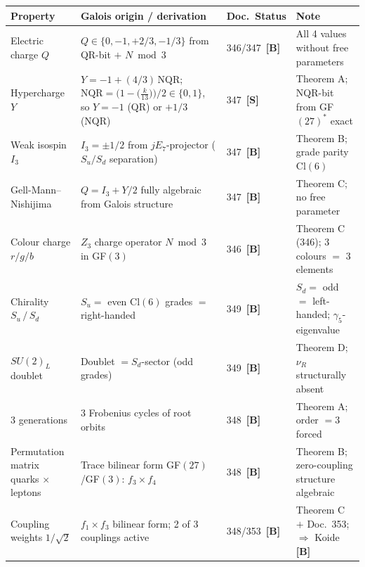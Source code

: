 \documentclass[10pt,a4paper,landscape]{article}
\begin{document}
\noindent
\begin{tabular}{|p{50mm}|p{68mm}|p{20mm}|p{125mm}|}
\hline
\rowcolor{hellgrau}
\textbf{Property} & \textbf{Galois origin / derivation} & \textbf{Doc.\ Status} & \textbf{Note}\\
\hline

Electric charge $Q$ &
$Q\in\{0,-1,+2/3,-1/3\}$ from QR-bit $+$ $N\bmod3$ &
346/347\ \textbf{[B]} &
All 4 values without free parameters\\
\hline

Hypercharge $Y$ &
$Y=-1+(4/3)\,\mathrm{NQR}$; $\mathrm{NQR}=\bigl(1-\bigl(\tfrac{k}{13}\bigr)\bigr)/2\in\{0,1\}$, so $Y=-1$ (QR) or $+1/3$ (NQR) &
347\ \textbf{[S]} &
Theorem A; NQR-bit from GF$(27)^*$ exact\\
\hline

Weak isospin $I_3$ &
$I_3=\pm1/2$ from $jE_7$-projector ($S_u/S_d$ separation) &
347\ \textbf{[B]} &
Theorem B; grade parity Cl$(6)$\\
\hline

Gell-Mann–Nishijima &
$Q=I_3+Y/2$ fully algebraic from Galois structure &
347\ \textbf{[B]} &
Theorem C; no free parameter\\
\hline

Colour charge $r/g/b$ &
$Z_3$ charge operator $N\bmod3$ in GF$(3)$ &
346\ \textbf{[B]} &
Theorem C (346); 3 colours $=$ 3 elements\\
\hline

Chirality $S_u\,/\,S_d$ &
$S_u=$ even Cl$(6)$ grades $=$ right-handed &
349\ \textbf{[B]} &
$S_d=$ odd $=$ left-handed; $\gamma_5$-eigenvalue\\
\hline

$SU(2)_L$ doublet &
Doublet $= S_d$-sector (odd grades) &
349\ \textbf{[B]} &
Theorem D; $\nu_R$ structurally absent\\
\hline

3 generations &
3 Frobenius cycles of root orbits &
348\ \textbf{[B]} &
Theorem A; order $=3$ forced\\
\hline

Permutation matrix quarks $\times$ leptons &
Trace bilinear form GF$(27)$/GF$(3)$: $f_3\times f_4$ &
348\ \textbf{[B]} &
Theorem B; zero-coupling structure algebraic\\
\hline

Coupling weights $1/\sqrt{2}$ &
$f_1\times f_3$ bilinear form; 2 of 3 couplings active &
348/353\ \textbf{[B]} &
Theorem C $+$ Doc.~353; $\Rightarrow$ Koide \textbf{[B]}\\
\hline


\end{tabular}
\end{document}
